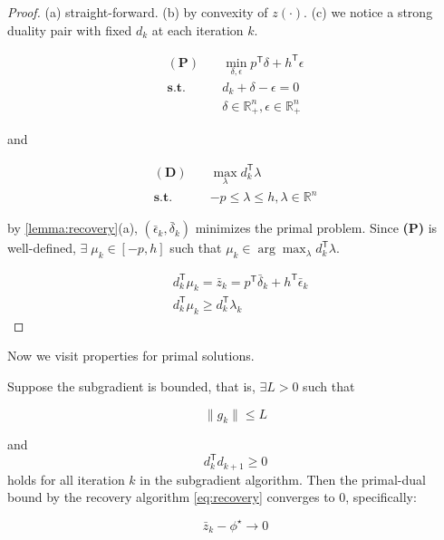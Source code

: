 \begin{proof}
  (a) straight-forward. (b) by convexity of \(z(\cdot)\). (c)
  we notice a strong duality pair with fixed \(d_k\) at each iteration
  \(k\).

  \begin{equation}
    \begin{aligned}
      \mathbf{(P)}  \quad & \min_{\delta, \epsilon} p^\mathsf{T} \delta + h^\mathsf{T} \epsilon \\
      \mathbf{s.t.} \quad & d_k + \delta - \epsilon = 0                                         \\
                          & \delta \in \mathbb{R}_+^n, \epsilon \in \mathbb{R}_+^n
    \end{aligned}
  \end{equation}

  and

  \begin{equation}
    \begin{aligned}
      \mathbf{(D)}  \quad & \max_{\lambda} d_k^\mathsf{T} \lambda          \\
      \mathbf{s.t.} \quad & -p \le \lambda \le h, \lambda \in \mathbb{R}^n
    \end{aligned}
  \end{equation}

  by \ref{lemma:recovery}(a), \((\bar \epsilon_k, \bar \delta_k)\) minimizes the primal
  problem. Since \textbf{(P)} is well-defined,
  \(\exists\; \mu_k \in [-p, h]\) such that \(\mu_k \in \arg\max_{\lambda} d_k^\mathsf{T} \lambda \).

  \[\begin{aligned}
       & d_k^\mathsf{T} \mu_k = \bar z_k = p^\mathsf{T} \bar \delta_k + h^\mathsf{T} \bar \epsilon_k \\
       & d_k^\mathsf{T} \mu_k \ge  d_k^\mathsf{T} \lambda_k
    \end{aligned}\]


\end{proof}

Now we visit properties for primal solutions.

\begin{theorem} \label{theorem:primal}

  Suppose the subgradient is bounded, that is, \(\exists L > 0\) such that

  \begin{equation}\label{eq:bounded_subgrad}
    \|g_k\| \le L
  \end{equation}

  and
  \begin{equation}\label{eq:non_orthogonal_direction}
    d_k^\mathsf{T} d_{k+1} \ge 0
  \end{equation}
  holds for all iteration \(k\) in the subgradient algorithm.
  Then the primal-dual bound by the recovery algorithm \eqref{eq:recovery} converges to \(0\), specifically:

  \[\bar z_k - \phi^\star \to 0\]

\end{theorem}

